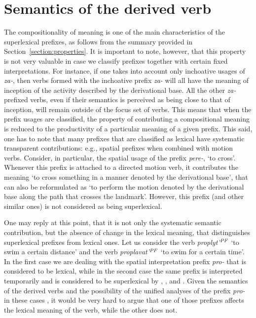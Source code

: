 \section{Semantics of the derived verb}\label{section:new:compositionality}
The compositionality of meaning is one of the main characteristics of the superlexical prefixes, as follows from the summary provided in Section~\ref{section:properties}. It is important to note, however, that this property is not very valuable in case we classify prefixes together with certain fixed interpretations. For instance, if one takes into account only inchoative usages of \textit{za-}, then verbs formed with the inchoative prefix \textit{za-} will all have the meaning of inception of the activity described by the derivational base. All the other \textit{za-}prefixed verbs, even if their semantics is perceived as being close to that of inception, will remain outside of the focus set of verbs. This means that when the prefix usages are classified, the property of contributing a compositional meaning is reduced to the productivity of a particular meaning of a given prefix. This said, one has to note that many prefixes that are classified as lexical have systematic transparent contributions: e.g., spatial prefixes when combined with motion verbs. Consider, in particular, the spatial usage of the prefix \textit{pere-}, `to cross'. Whenever this prefix is attached to a directed motion verb, it contributes the meaning `to cross something in a manner denoted by the derivational base', that can also be reformulated as `to perform the motion denoted by the derivational base along the path that crosses the landmark'. However, this prefix (and other similar ones) is not considered as being superlexical.

One may reply at this point, that it is not only the systematic semantic contribution, but the absence of change in the lexical meaning, that distinguishes superlexical prefixes from lexical ones. Let us consider the verb \textit{proplyt'}$^{\mathit{PF}}$ `to swim a certain distance' and the verb \textit{proplavat'}$^{\mathit{PF}}$ `to swim for a certain time'. In the first case we are dealing with the spatial interpretation prefix \textit{pro-} that is considered to be lexical, while in the second case the same prefix is interpreted temporarily and is considered to be superlexical by \citet{Babko-Malaya:99}, \citet{Svenonius:04a}, and \citet{Svenonius:12}. Given the semantics of the derived verbs and the possibility of the unified analyses of the prefix \textit{pro-} in these cases \citep{Kagan:book, ZinovaOsswald:paper}, it would be very hard to argue that one of those prefixes affects the lexical meaning of the verb, while the other does not. 

